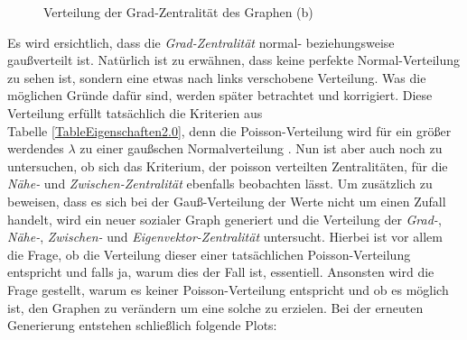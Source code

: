 \FloatBarrier
\begin{figure}[h!]%
  \centering
  \qquad
  \caption{Verteilung der Grad-Zentralität des Graphen (b)}%
  \label{fig:distribution}
\end{figure}
\FloatBarrier

Es wird ersichtlich, dass die \textit{Grad-Zentralität} normal- beziehungsweise gaußverteilt ist. Natürlich ist zu erwähnen, dass keine perfekte Normal-Verteilung zu sehen ist, sondern eine etwas nach links verschobene Verteilung. Was die möglichen Gründe dafür sind, werden später betrachtet und korrigiert. Diese Verteilung erfüllt tatsächlich die Kriterien aus \\
Tabelle \ref{TableEigenschaften2.0}, denn die Poisson-Verteilung wird für ein größer werdendes $\lambda$ zu einer gaußschen Normalverteilung \cite{Poisson}. Nun ist aber auch noch zu untersuchen, ob sich das Kriterium, der  poisson verteilten Zentralitäten, für die \textit{Nähe-} und \textit{Zwischen-Zentralität} ebenfalls beobachten lässt. Um zusätzlich zu beweisen, dass es sich bei der Gauß-Verteilung der Werte nicht um einen Zufall handelt, wird ein neuer sozialer Graph generiert und die Verteilung der \textit{Grad-}, \textit{Nähe-}, \textit{Zwischen-} und \textit{Eigenvektor-Zentralität} untersucht. Hierbei ist vor allem die Frage, ob die Verteilung dieser einer tatsächlichen Poisson-Verteilung entspricht und falls ja, warum dies der Fall ist, essentiell. Ansonsten wird die Frage gestellt, warum es keiner Poisson-Verteilung entspricht und ob es möglich ist, den Graphen zu verändern um eine solche zu erzielen. Bei der erneuten Generierung entstehen schließlich folgende Plots:

